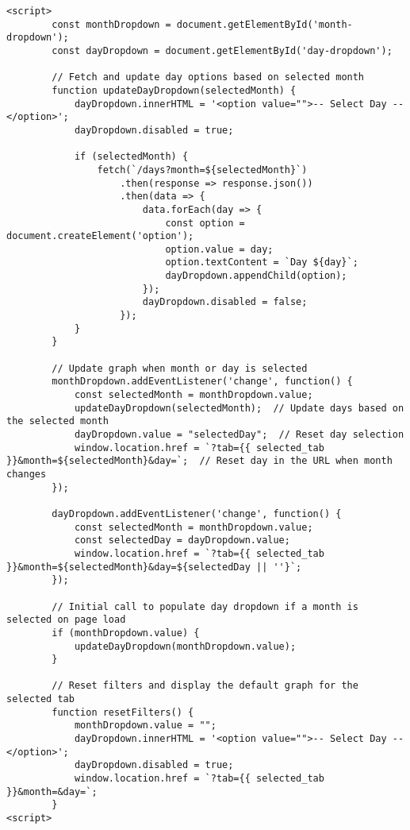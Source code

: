 \begin{lstlisting}[style=HTML, caption={JavaScript for Dynamic Behavior}]
<script>
        const monthDropdown = document.getElementById('month-dropdown');
        const dayDropdown = document.getElementById('day-dropdown');

        // Fetch and update day options based on selected month
        function updateDayDropdown(selectedMonth) {
            dayDropdown.innerHTML = '<option value="">-- Select Day --</option>';
            dayDropdown.disabled = true;

            if (selectedMonth) {
                fetch(`/days?month=${selectedMonth}`)
                    .then(response => response.json())
                    .then(data => {
                        data.forEach(day => {
                            const option = document.createElement('option');
                            option.value = day;
                            option.textContent = `Day ${day}`;
                            dayDropdown.appendChild(option);
                        });
                        dayDropdown.disabled = false;
                    });
            }
        }

        // Update graph when month or day is selected
        monthDropdown.addEventListener('change', function() {
            const selectedMonth = monthDropdown.value;
            updateDayDropdown(selectedMonth);  // Update days based on the selected month
            dayDropdown.value = "selectedDay";  // Reset day selection
            window.location.href = `?tab={{ selected_tab }}&month=${selectedMonth}&day=`;  // Reset day in the URL when month changes
        });

        dayDropdown.addEventListener('change', function() {
            const selectedMonth = monthDropdown.value;
            const selectedDay = dayDropdown.value;
            window.location.href = `?tab={{ selected_tab }}&month=${selectedMonth}&day=${selectedDay || ''}`;
        });

        // Initial call to populate day dropdown if a month is selected on page load
        if (monthDropdown.value) {
            updateDayDropdown(monthDropdown.value);
        }

        // Reset filters and display the default graph for the selected tab
        function resetFilters() {
            monthDropdown.value = "";
            dayDropdown.innerHTML = '<option value="">-- Select Day --</option>';
            dayDropdown.disabled = true;
            window.location.href = `?tab={{ selected_tab }}&month=&day=`; 
        }
<script>
\end{lstlisting}